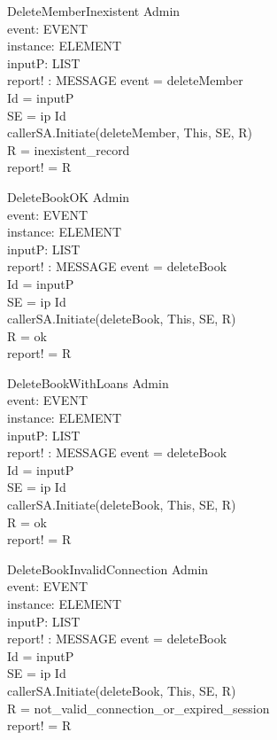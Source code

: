 \begin{schema}{DeleteMemberInexistent}
\Xi Admin \\
event: EVENT \\
instance: ELEMENT \\
inputP: LIST \\
report! : MESSAGE 
\where event = deleteMember \\
Id = \head inputP \\
SE = \lseq ip Id \rseq \\
callerSA.Initiate(deleteMember, This, SE, R) \\
R = inexistent\_record \\
report! = R
\end{schema}


\begin{schema}{DeleteBookOK}
\Xi Admin \\
event: EVENT \\
instance: ELEMENT \\
inputP: LIST \\
report! : MESSAGE 
\where event = deleteBook \\
Id = \head inputP \\
SE = \lseq ip Id \rseq \\
callerSA.Initiate(deleteBook, This, SE, R) \\
R = ok \\
report! = R 
\end{schema}

\begin{schema}{DeleteBookWithLoans}
\Xi Admin \\
event: EVENT \\
instance: ELEMENT \\
inputP: LIST \\
report! : MESSAGE 
\where event = deleteBook \\
Id = \head inputP \\
SE = \lseq ip Id \rseq \\
callerSA.Initiate(deleteBook, This, SE, R) \\
R = ok \\
report! = R 
\end{schema}

\begin{schema}{DeleteBookInvalidConnection}
\Xi Admin \\
event: EVENT \\
instance: ELEMENT \\
inputP: LIST \\
report! : MESSAGE 
\where event = deleteBook \\
Id = \head inputP \\
SE = \lseq ip Id \rseq \\
callerSA.Initiate(deleteBook, This, SE, R) \\
R = not\_valid\_connection\_or\_expired\_session \\ 
report! = R 
\end{schema}


